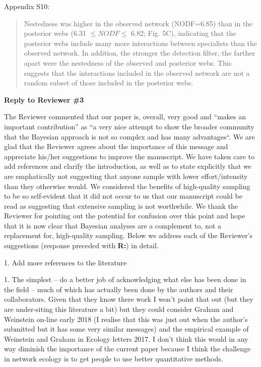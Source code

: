\documentclass[12pt]{letter}
\newenvironment{refquote}{\bigskip \begin{it}}{\end{it}\smallskip}
\begin{document}
		Appendix S10:


		\begin{quotation}
			Nestedness was higher in the observed network (NODF=6.85) than in the posterior webs (6.31 $\leq NODF \leq$ 6.82; Fig. 5C), indicating that the posterior webs include many more interactions between specialists than the observed network. In addition, the stronger the detection filter, the farther apart were the nestedness of the observed and posterior webs. This suggests that the interactions included in the observed network are not a random subset of those included in the posterior webs.
		\end{quotation}

\clearpage

{\Large \bf Reply to Reviewer \#3}

	The Reviewer commented that our paper is, overall, very good and ``makes an important contribution'' as ``a very nice attempt to show the broader community that the Bayesian approach is not so complex and has many advantages``. We are glad that the Reviewer agrees about the importance of this message and appreciate his/her suggestions to improve the manuscript. We have taken care to add references and clarify the introduction, as well as to state explicitly that we are emphatically not suggesting that anyone sample with lower effort/intensity than they otherwise would. We considered the benefits of high-quality sampling to be so self-evident that it did not occur to us that our manuscript could be read as suggesting that extensive sampling is not worthwhile. We thank the Reviewer for pointing out the potential for confusion over this point and hope that it is now clear that Bayesian analyses are a complement to, not a replacement for, high-quality sampling. Below we address each of the Reviewer's suggestions (response preceded with \textbf{R:}) in detail.


	1. Add more references to the literature


		\begin{refquote}
		1.      The simplest – do a better job of acknowledging what else has been done in the field – much of which has actually been done by the authors and their collaborators.  Given that they know there work I won't point that out (but they are under-siting this literature a bit) but they could consider Graham and Weinstein on-line early 2018 (I realise that this was just out when the author's submitted but it has some very similar messages) and the empirical example of Weinstein and Graham in Ecology letters 2017.  I don't think this would in any way diminish the importance of the current paper because I think the challenge in network ecology is to get people to use better quantitative methods.
		\end{refquote}
\end{document}
